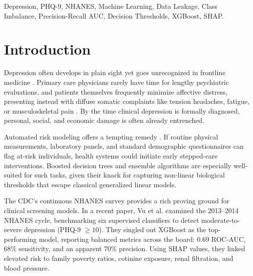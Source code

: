 \documentclass[conference]{IEEEtran}
\begin{document}
\begin{IEEEkeywords}
Depression, PHQ-9, NHANES, Machine Learning, Data Leakage, Class Imbalance, Precision-Recall AUC, Decision Thresholds, XGBoost, SHAP.
\end{IEEEkeywords}

\section{Introduction}
Depression often develops in plain sight yet goes unrecognized in frontline medicine \cite{santomauro2021}. Primary care physicians rarely have time for lengthy psychiatric evaluations, and patients themselves frequently minimize affective distress, presenting instead with diffuse somatic complaints like tension headaches, fatigue, or musculoskeletal pain \cite{kroenke2001}. By the time clinical depression is formally diagnosed, personal, social, and economic damage is often already entrenched.

Automated risk modeling offers a tempting remedy \cite{nemesure2021}. If routine physical measurements, laboratory panels, and standard demographic questionnaires can flag at-risk individuals, health systems could initiate early stepped-care interventions. Boosted decision trees and ensemble algorithms are especially well-suited for such tasks, given their knack for capturing non-linear biological thresholds that escape classical generalized linear models.

The CDC's continuous NHANES survey provides a rich proving ground for clinical screening models. In a recent paper, Vu et al. \cite{vu2025} examined the 2013--2014 NHANES cycle, benchmarking six supervised classifiers to detect moderate-to-severe depression (PHQ-9 $\ge 10$). They singled out XGBoost as the top-performing model, reporting balanced metrics across the board: 0.69 ROC-AUC, 68\% sensitivity, and an apparent 70\% precision. Using SHAP values, they linked elevated risk to family poverty ratios, cotinine exposure, renal filtration, and blood pressure.
\end{document}
